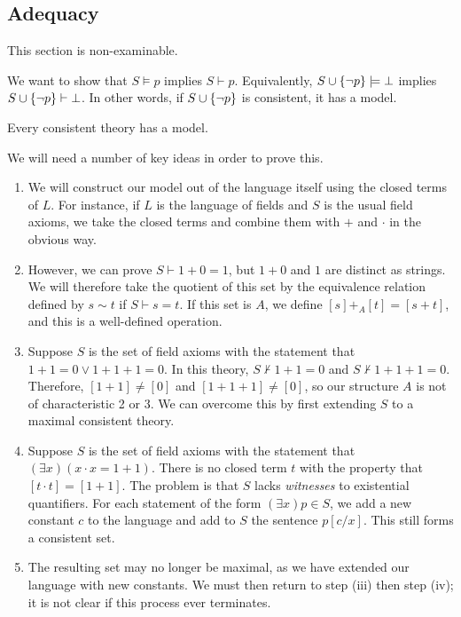 \subsection{Adequacy}
This section is non-examinable.

We want to show that \( S \models p \) implies \( S \vdash p \).
Equivalently, \( S \cup \qty{\neg p} \models \bot \) implies \( S \cup \qty{\neg p} \vdash \bot \).
In other words, if \( S \cup \qty{\neg p} \) is consistent, it has a model.
\begin{theorem}
    Every consistent theory has a model.
\end{theorem}
We will need a number of key ideas in order to prove this.
\begin{enumerate}
    \item We will construct our model out of the language itself using the closed terms of \( L \).
    For instance, if \( L \) is the language of fields and \( S \) is the usual field axioms, we take the closed terms and combine them with \( + \) and \( \cdot \) in the obvious way.
    \item However, we can prove \( S \vdash 1 + 0 = 1 \), but \( 1 + 0 \) and \( 1 \) are distinct as strings.
    We will therefore take the quotient of this set by the equivalence relation defined by \( s \sim t \) if \( S \vdash s = t \).
    If this set is \( A \), we define \( [s] +_A [t] = [s + t] \), and this is a well-defined operation.
    \item Suppose \( S \) is the set of field axioms with the statement that \( 1 + 1 = 0 \vee 1 + 1 + 1 = 0 \).
    In this theory, \( S \not\vdash 1 + 1 = 0 \) and \( S \not\vdash 1 + 1 + 1 = 0 \).
    Therefore, \( [1+1] \neq [0] \) and \( [1+1+1] \neq [0] \), so our structure \( A \) is not of characteristic 2 or 3.
    We can overcome this by first extending \( S \) to a maximal consistent theory.
    \item Suppose \( S \) is the set of field axioms with the statement that \( (\exists x)(x \cdot x = 1 + 1) \).
    There is no closed term \( t \) with the property that \( [t\cdot t] = [1+1] \).
    The problem is that \( S \) lacks \emph{witnesses} to existential quantifiers.
    For each statement of the form \( (\exists x)p \in S \), we add a new constant \( c \) to the language and add to \( S \) the sentence \( p[c/x] \).
    This still forms a consistent set.
    \item The resulting set may no longer be maximal, as we have extended our language with new constants.
    We must then return to step (iii) then step (iv); it is not clear if this process ever terminates.
\end{enumerate}
